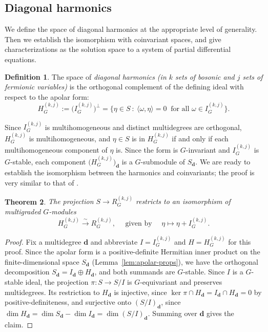 \documentclass[12pt]{amsart}
\theoremstyle{plain}
\newtheorem{theorem}{Theorem}[section]
\theoremstyle{definition}
\newtheorem{definition}[theorem]{Definition}
\begin{document}
\subsection{Diagonal harmonics}
We define the space of diagonal harmonics at the appropriate level of generality. 
Then we establish the isomorphism with coinvariant spaces, and give characterizations as the solution space to a system of partial differential equations.

\begin{definition}\label{def:harmonics}
The space of \emph{diagonal harmonics (in $k$ sets of bosonic and $j$ sets of fermionic variables)} is the orthogonal complement of the defining ideal with respect to the apolar form:
\begin{equation}
    H_G^{(k,j)} := \big(I_G^{(k,j)}\big)^{\perp} = \big\{ \eta \in S \ :\ \langle \omega, \eta \rangle = 0 \ \text{ for all } \omega \in I_G^{(k,j)} \big\}.
\end{equation}
\end{definition}

Since $I_G^{(k,j)}$ is multihomogeneous and distinct multidegrees are orthogonal, $H_G^{(k,j)}$ is multihomogeneous, and $\eta \in S$ is in  $H_G^{(k,j)}$ if and only if each multihomogeneous component of $\eta$ is. 
Since the form is $G$-invariant and $I_G^{(k,j)}$ is $G$-stable, each component $\big(H_G^{(k,j)}\big)_{\bm{d}}$ is a $G$-submodule of $S_{\bm{d}}$.
We are ready to establish the isomorphism between the harmonics and coinvariants; the proof is very similar to that of \cite[Proposition 1.3.1]{Haiman1994}.
\begin{theorem}\label{thm:harmonics-iso}
The projection $S \to R_G^{(k,j)}$ restricts to an isomorphism of multigraded $G$-modules
\begin{equation}
    H_G^{(k,j)} \xrightarrow{\ \sim\ } R_G^{(k,j)}, \quad \text{ given by } \quad \eta \mapsto \eta + I_G^{(k,j)}.
\end{equation}
\end{theorem}

\begin{proof}
Fix a multidegree $\bm{d}$ and abbreviate $I = I_G^{(k,j)}$ and $H = H_G^{(k,j)}$ for this proof. 
Since the apolar form is a positive-definite Hermitian inner product on the finite-dimensional space $S_{\bm{d}}$ (Lemma~\ref{lem:apolar-props}), we have the orthogonal decomposition $S_{\bm{d}} = I_{\bm{d}} \oplus H_{\bm{d}}$, and both summands are $G$-stable. 
Since $I$ is a $G$-stable ideal, the projection $\pi \colon S \to S/I$ is $G$-equivariant and preserves multidegrees. 
Its restriction to $H_{\bm{d}}$ is injective, since $\ker \pi \cap H_{\bm{d}} = I_{\bm{d}} \cap H_{\bm{d}} = 0$ by positive-definiteness, and surjective onto $(S/I)_{\bm{d}}$, since $\dim H_{\bm{d}} = \dim S_{\bm{d}} - \dim I_{\bm{d}} = \dim (S/I)_{\bm{d}}$. 
Summing over $\bm{d}$ gives the claim.
\end{proof}
\end{document}
